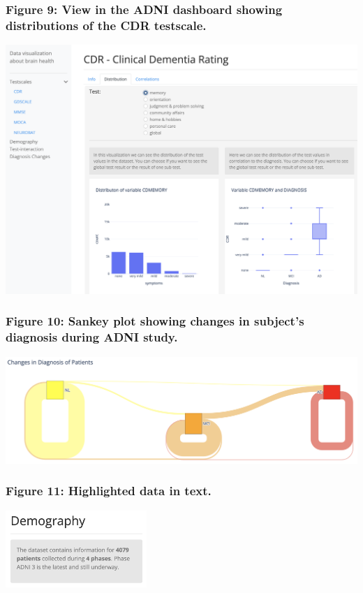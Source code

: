 \documentclass[11pt]{article}
\begin{document}
\subsubsection{Figure 9: View in the ADNI dashboard showing distributions of the CDR testscale.}
\includegraphics{./adni-cdr.png}

\subsubsection{Figure 10: Sankey plot showing changes in subject's diagnosis during ADNI study.}
\includegraphics{./sankey.png}

\subsubsection{Figure 11: Highlighted data in text.}
\includegraphics[width=0.4\textwidth]{./info-in-text.png}

\pagebreak
\printbibliography
\end{document}
